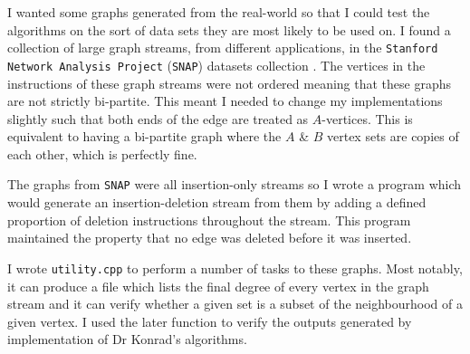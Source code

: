 \documentclass[11pt,twoside,a4paper]{report}
\begin{document}
\par I wanted some graphs generated from the real-world so that I could test the algorithms on the sort of data sets they are most likely to be used on. I found a collection of large graph streams, from different applications, in the \texttt{Stanford Network Analysis Project} (\texttt{SNAP}) datasets collection \cite{SNAP}. %
The vertices in the instructions of these graph streams were not ordered meaning that these graphs are not strictly bi-partite. %
This meant I needed to change my implementations slightly such that both ends of the edge are treated as $A$-vertices. This is equivalent to having a bi-partite graph where the $A$ \& $B$ vertex sets are copies of each other, which is perfectly fine.
\par The graphs from \texttt{SNAP} were all insertion-only streams so I wrote a program which would generate an insertion-deletion stream from them by adding a defined proportion of deletion instructions throughout the stream. This program maintained the property that no edge was deleted before it was inserted.
\par I wrote \texttt{utility.cpp} to perform a number of tasks to these graphs. Most notably, it can produce a file which lists the final degree of every vertex in the graph stream and it can verify whether a given set is a subset of the neighbourhood of a given vertex. I used the later function to verify the outputs generated by implementation of Dr Konrad's algorithms.
\end{document}
